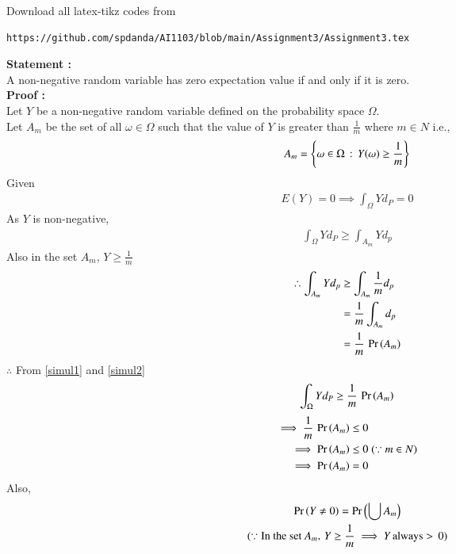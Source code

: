 \documentclass[journal,12pt,twocolumn]{IEEEtran}
\begin{document}
\author{Name: Sai Pravallika Danda, Roll Number: CS20BTECH11013}
\maketitle
\newpage
\bigskip
\renewcommand{\thefigure}{\theenumi}
\renewcommand{\thetable}{\theenumi}
Download all latex-tikz codes from 
%
\begin{lstlisting}
https://github.com/spdanda/AI1103/blob/main/Assignment3/Assignment3.tex
\end{lstlisting}
\large\textbf{Statement :}\\
A non-negative random variable has zero expectation value if and only if it is zero.\\
\textbf{Proof :}\\
Let $Y$ be a non-negative random variable defined on the probability space $\Omega$.\\
Let $A_m$ be the set of all $\omega \in \Omega$ such that the value of $Y$ is greater than $\frac{1}{m}$ where $m \in N$ i.e.,
$$A_m = \left\{\omega \in \Omega\,:\,Y(\omega) \geq \frac{1}{m}\right\}$$
Given
\begin{align}
    E(Y) =0 \implies \int_\Omega Yd_P =0
\end{align}
As $Y$ is non-negative,
\begin{align}
    \int_\Omega Yd_P \geq \int_{A_m}Yd_p \label{simul1}
\end{align}
Also in the set $A_m$, $Y \geq \frac{1}{m}$
\begin{align}
  \therefore \int_{A_m}Yd_p  &\geq  \int_{A_m}\frac{1}{m}d_p\\
                             &= \frac{1}{m}\int_{A_m}d_p\\
                             &= \frac{1}{m}\,\Pr\left(A_m\right) \label{simul2}
\end{align}
$\therefore$ From \eqref{simul1} and \eqref{simul2}
\begin{align}
  \int_\Omega Yd_P \geq \frac{1}{m}\,\Pr\left(A_m\right)
\end{align}
\begin{align}
    \implies \frac{1}{m}\,\Pr\left(A_m\right) &\leq 0\\
    \implies \Pr\left(A_m\right) &\leq 0\;(\because m \in N)\\
    \implies \Pr\left(A_m\right) &= 0
\end{align}
Also,
\begin{multline}
    \Pr\left(Y \neq 0\right) = \Pr\left(\bigcup A_m\right)\\(\because \text{In the set } A_m,\,Y \geq \frac{1}{m} \implies Y\,\text{always}> \,0)
\end{multline}
\end{document}
